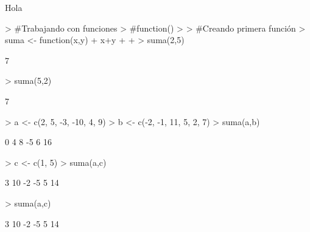 \documentclass{article}
\begin{document}

Hola
\begin{Schunk}
\begin{Sinput}
> #Trabajando con funciones
> #function(){}
> 
> #Creando primera función
> suma <- function(x,y){
+   x+y
+   
+   }
> suma(2,5)
\end{Sinput}
\begin{Soutput}
[1] 7
\end{Soutput}
\begin{Sinput}
> suma(5,2)
\end{Sinput}
\begin{Soutput}
[1] 7
\end{Soutput}
\begin{Sinput}
> a <- c(2, 5, -3, -10, 4, 9)
> b <- c(-2, -1, 11, 5, 2, 7)
> suma(a,b)
\end{Sinput}
\begin{Soutput}
[1]  0  4  8 -5  6 16
\end{Soutput}
\begin{Sinput}
> c <- c(1, 5)
> suma(a,c)
\end{Sinput}
\begin{Soutput}
[1]  3 10 -2 -5  5 14
\end{Soutput}
\begin{Sinput}
> suma(a,c)
\end{Sinput}
\begin{Soutput}
[1]  3 10 -2 -5  5 14
\end{Soutput}
\end{Schunk}
\end{document}
